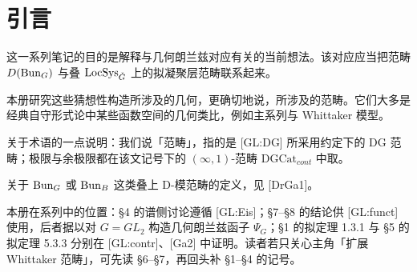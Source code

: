 \chapter*{引言}

这一系列笔记的目的是解释与几何朗兰兹对应有关的当前想法。该对应应当把范畴 $D(\operatorname{Bun}_G)$ 与叠 $\operatorname{LocSys}_{\check G}$ 上的拟凝聚层范畴联系起来。

本册研究这些猜想性构造所涉及的几何，更确切地说，所涉及的范畴。它们大多是经典自守形式论中某些函数空间的几何类比，例如主系列与 Whittaker 模型。

关于术语的一点说明：我们说「范畴」，指的是 [GL:DG] 所采用约定下的 DG 范畴；极限与余极限都在该文记号下的 $(\infty,1)$-范畴 $\mathrm{DGCat}_{cont}$ 中取。

关于 $\operatorname{Bun}_G$ 或 $\operatorname{Bun}_B$ 这类叠上 D-模范畴的定义，见 [DrGa1]。

\begin{annote}
本册在系列中的位置：§4 的谱侧讨论遵循 [GL:Eis]；§7--§8 的结论供 [GL:funct] 使用，后者据以对 $G=GL_2$ 构造几何朗兰兹函子 $\Psi_G$；§1 的拟定理 1.3.1 与 §5 的拟定理 5.3.3 分别在 [GL:contr]、[Ga2] 中证明。读者若只关心主角「扩展 Whittaker 范畴」，可先读 §6--§7，再回头补 §1--§4 的记号。\par\vspace{0.15em}{\raggedleft 【来源：原书各处引用（A）】\par}
\end{annote}
